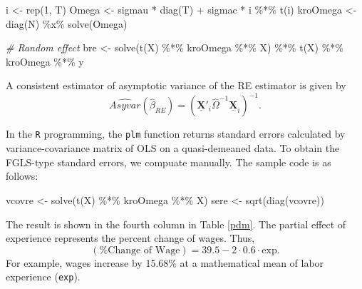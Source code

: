 \documentclass[
  12pt,
]{article}
\newenvironment{Shaded}{\begin{snugshade}}{\end{snugshade}}
\newcommand{\CommentTok}[1]{\textcolor[rgb]{0.56,0.35,0.01}{\textit{#1}}}
\newcommand{\DecValTok}[1]{\textcolor[rgb]{0.00,0.00,0.81}{#1}}
\newcommand{\FunctionTok}[1]{\textcolor[rgb]{0.00,0.00,0.00}{#1}}
\newcommand{\NormalTok}[1]{#1}
\newcommand{\OtherTok}[1]{\textcolor[rgb]{0.56,0.35,0.01}{#1}}
\newcommand{\SpecialCharTok}[1]{\textcolor[rgb]{0.00,0.00,0.00}{#1}}
\begin{document}
\begin{Shaded}
\begin{Highlighting}[]
\NormalTok{i }\OtherTok{\textless{}{-}} \FunctionTok{rep}\NormalTok{(}\DecValTok{1}\NormalTok{, T)}
\NormalTok{Omega }\OtherTok{\textless{}{-}}\NormalTok{ sigmau }\SpecialCharTok{*} \FunctionTok{diag}\NormalTok{(T) }\SpecialCharTok{+}\NormalTok{ sigmac }\SpecialCharTok{*}\NormalTok{ i }\SpecialCharTok{\%*\%} \FunctionTok{t}\NormalTok{(i)}
\NormalTok{kroOmega }\OtherTok{\textless{}{-}} \FunctionTok{diag}\NormalTok{(N) }\SpecialCharTok{\%x\%} \FunctionTok{solve}\NormalTok{(Omega)}

\CommentTok{\# Random effect}
\NormalTok{bre }\OtherTok{\textless{}{-}} \FunctionTok{solve}\NormalTok{(}\FunctionTok{t}\NormalTok{(X) }\SpecialCharTok{\%*\%}\NormalTok{ kroOmega }\SpecialCharTok{\%*\%}\NormalTok{ X) }\SpecialCharTok{\%*\%} \FunctionTok{t}\NormalTok{(X) }\SpecialCharTok{\%*\%}\NormalTok{ kroOmega }\SpecialCharTok{\%*\%}\NormalTok{ y}
\end{Highlighting}
\end{Shaded}

A consistent estimator of asymptotic variance of the RE estimator is
given by \[
  \hat{Asyvar}(\hat{\beta}_{RE}) = 
  \left( \underline{\mathbf{X}}'_i \hat{\Omega}^{-1} \underline{\mathbf{X}}_i \right)^{-1}.
\]

In the \texttt{R} programming, the \texttt{plm} function returns
standard errors calculated by variance-covariance matrix of OLS on a
quasi-demeaned data. To obtain the FGLS-type standard errors, we
compuate manually. The sample code is as follows:

\begin{Shaded}
\begin{Highlighting}[]
\NormalTok{vcovre }\OtherTok{\textless{}{-}} \FunctionTok{solve}\NormalTok{(}\FunctionTok{t}\NormalTok{(X) }\SpecialCharTok{\%*\%}\NormalTok{ kroOmega }\SpecialCharTok{\%*\%}\NormalTok{ X)}
\NormalTok{sere }\OtherTok{\textless{}{-}} \FunctionTok{sqrt}\NormalTok{(}\FunctionTok{diag}\NormalTok{(vcovre))}
\end{Highlighting}
\end{Shaded}

The result is shown in the fourth column in Table \ref{pdm}. The partial
effect of experience represents the percent change of wages. Thus, \[
  (\text{\% Change of Wage}) = 39.5 - 2 \cdot 0.6 \cdot \text{exp}.
\] For example, wages increase by 15.68\% at a mathematical mean of
labor experience (\texttt{exp}).
\end{document}
